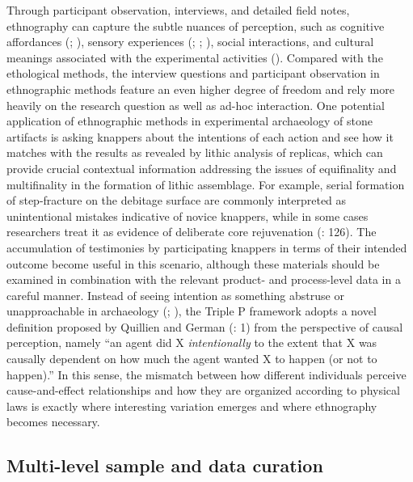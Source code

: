 \documentclass[
  11pt,
  letterpaper,
  DIV=11,
  numbers=noendperiod]{scrartcl}
\begin{document}
Through participant observation, interviews, and detailed field notes,
ethnography can capture the subtle nuances of perception, such as
cognitive affordances (; ), sensory
experiences (;
;
), social interactions,
and cultural meanings associated with the experimental activities
(). Compared with the
ethological methods, the interview questions and participant observation
in ethnographic methods feature an even higher degree of freedom and
rely more heavily on the research question as well as ad-hoc
interaction. One potential application of ethnographic methods in
experimental archaeology of stone artifacts is asking knappers about the
intentions of each action and see how it matches with the results as
revealed by lithic analysis of replicas, which can provide crucial
contextual information addressing the issues of equifinality and
multifinality in the formation of lithic assemblage. For example, serial
formation of step-fracture on the debitage surface are commonly
interpreted as unintentional mistakes indicative of novice knappers,
while in some cases researchers treat it as evidence of deliberate core
rejuvenation (: 126). The
accumulation of testimonies by participating knappers in terms of their
intended outcome become useful in this scenario, although these
materials should be examined in combination with the relevant product-
and process-level data in a careful manner. Instead of seeing intention
as something abstruse or unapproachable in archaeology
(;
), the Triple P framework
adopts a novel definition proposed by Quillien and German
(: 1) from the perspective of causal
perception, namely ``an agent did X \emph{intentionally} to the extent
that X was causally dependent on how much the agent wanted X to happen
(or not to happen).'' In this sense, the mismatch between how different
individuals perceive cause-and-effect relationships and how they are
organized according to physical laws is exactly where interesting
variation emerges and where ethnography becomes necessary.

\subsection{Multi-level sample and data
curation}\label{multi-level-sample-and-data-curation}
\end{document}
